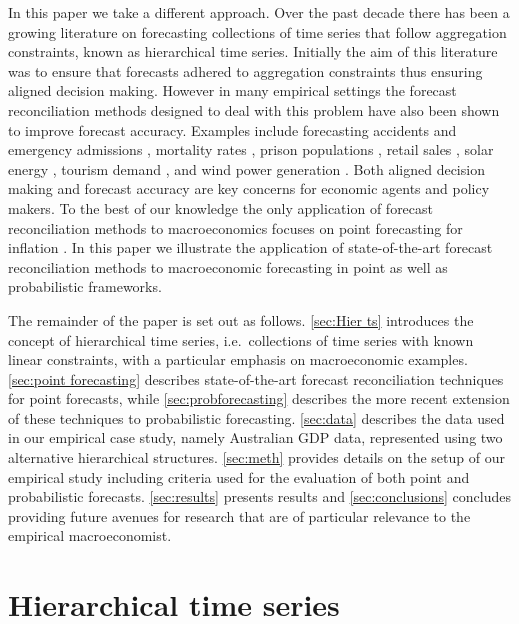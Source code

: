 \documentclass[a4paper, 11pt]{article}
\begin{document}
In this paper we take a different approach. Over the past decade there has been a growing literature on forecasting collections of time series that follow aggregation constraints, known as hierarchical time series. Initially the aim of this literature was to ensure that forecasts adhered to aggregation constraints thus ensuring aligned decision making. However in many empirical settings the forecast reconciliation methods designed to deal with this problem have also been shown to improve forecast accuracy. Examples include forecasting accidents and emergency admissions \citep{AthEtAl2017}, mortality rates \citep{ShaHyn2017}, prison populations \citep{AthEtAl2019}, retail sales \citep{VilPed2018}, solar energy \citep{YanEtAl2017,YagEtAl2019}, tourism demand \citep{AthEtAl2009, HynEtAl2011, WicEtAl2019}, and wind power generation \citep{ZhaDon2018}. Both aligned decision making and forecast accuracy are key concerns for economic agents and policy makers. To the best of our knowledge the only application of forecast reconciliation methods to macroeconomics focuses on point forecasting for inflation \citep{capistran2010multi,weiss2018essays}.
In this paper we illustrate the application of state-of-the-art forecast reconciliation methods to macroeconomic forecasting in point as well as probabilistic frameworks.

The remainder of the paper is set out as follows. \autoref{sec:Hier ts} introduces the concept of hierarchical time series, i.e.\ collections of time series with known linear constraints, with a particular emphasis on macroeconomic examples. \autoref{sec:point forecasting} describes state-of-the-art forecast reconciliation techniques for point forecasts, while \autoref{sec:probforecasting} describes the more recent extension of these techniques to probabilistic forecasting. \autoref{sec:data} describes the data used in our empirical case study, namely Australian GDP data, represented using two alternative hierarchical structures. \autoref{sec:meth} provides details on the setup of our empirical study including criteria used for the evaluation of both point and probabilistic forecasts. \autoref{sec:results} presents results and \autoref{sec:conclusions} concludes providing future avenues for research that are of particular relevance to the empirical macroeconomist.

\section{Hierarchical time series}\label{sec:Hier ts}
\end{document}
